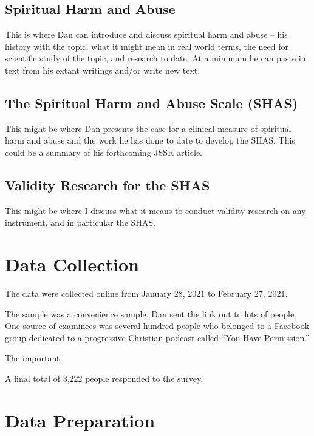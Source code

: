 \documentclass[
]{report}
\begin{document}
\hypertarget{spiritual-harm-and-abuse}{%
\section{Spiritual Harm and Abuse}\label{spiritual-harm-and-abuse}}

This is where Dan can introduce and discuss spiritual harm and abuse -- his history with the topic, what it might mean in real world terms, the need for scientific study of the topic, and research to date. At a minimum he can paste in text from his extant writings and/or write new text.

\hypertarget{the-spiritual-harm-and-abuse-scale-shas}{%
\section{The Spiritual Harm and Abuse Scale (SHAS)}\label{the-spiritual-harm-and-abuse-scale-shas}}

This might be where Dan presents the case for a clinical measure of spiritual harm and abuse and the work he has done to date to develop the SHAS. This could be a summary of his forthcoming JSSR article.

\hypertarget{validity-research-for-the-shas}{%
\section{Validity Research for the SHAS}\label{validity-research-for-the-shas}}

This might be where I discuss what it means to conduct validity research on any instrument, and in particular the SHAS.

\hypertarget{data-collection}{%
\chapter{Data Collection}\label{data-collection}}

The data were collected online from January 28, 2021 to February 27, 2021.

The sample was a convenience sample. Dan sent the link out to lots of people. One source of examinees was several hundred people who belonged to a Facebook group dedicated to a progressive Christian podcast called ``You Have Permission.''

The important

A final total of 3,222 people responded to the survey.

\hypertarget{data-preparation}{%
\chapter{Data Preparation}\label{data-preparation}}
\end{document}
